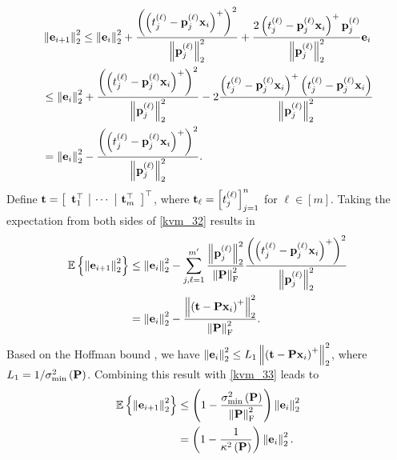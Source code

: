 \documentclass[12pt,draftcls,onecolumn]{IEEEtran}
\begin{document}
\begin{equation}
\begin{aligned}
\label{kvm_32}
&\left\|\mbe_{i+1}\right\|^2_2\leq \left\|\mbe_i\right\|^2_2+\frac{\left(\left(t^{(\ell)}_j-\mbp^{(\ell)}_j\mbx_{i}\right)^+\right)^2}{\left\|\mbp^{(\ell)}_j\right\|^2_2}+\frac{2\left(t^{(\ell)}_j-\mbp^{(\ell)}_j\mbx_{i}\right)^+\mbp^{(\ell)}_j}{\left\|\mbp^{(\ell)}_j\right\|^2_2}\mbe_i \\
&\leq\left\|\mbe_i\right\|^2_2+\frac{\left(\left(t^{(\ell)}_j-\mbp^{(\ell)}_j\mbx_{i}\right)^+\right)^2}{\left\|\mbp^{(\ell)}_j\right\|^2_2}-2\frac{\left(t^{(\ell)}_j-\mbp^{(\ell)}_j\mbx_{i}\right)^+\left(t^{(\ell)}_j-\mbp^{(\ell)}_j\mbx_{i}\right)}{\left\|\mbp^{(\ell)}_j\right\|^2_2}\\
&= \left\|\mbe_i\right\|^2_2-\frac{\left(\left(t^{(\ell)}_j-\mbp^{(\ell)}_j\mbx_{i}\right)^+\right)^2}{\left\|\mbp^{(\ell)}_j\right\|^2_2}.
\end{aligned}
\end{equation}\normalsize
Define $\mathbf{t}=\left[\begin{array}{c|c|c}
\mathbf{t}_1^{\top} &\cdots &\mathbf{t}_m^{\top}
\end{array}\right]^{\top}$, where $\mathbf{t}_{\ell}=\left[t_j^{(\ell)}\right]_{j=1}^{n}$ for $\ell\in[m]$. Taking the expectation from both sides of \eqref{kvm_32} results in 
\begin{equation}
\begin{aligned}
\label{kvm_33}
\mathbb{E}\left\{\left\|\mbe_{i+1}\right\|^2_2\right\}&\leq \left\|\mbe_i\right\|^2_2-\sum_{j,\ell=1}^{m^{\prime}}\frac{\left\|\mbp^{(\ell)}_j\right\|^2_2}{\left\|\mbP\right\|^2_{\mathrm{F}}}\frac{\left(\left(t^{(\ell)}_j-\mbp^{(\ell)}_j\mbx_{i}\right)^+\right)^2}{\left\|\mbp^{(\ell)}_j\right\|^2_2}\\
&= \left\|\mbe_i\right\|^2_2-\frac{\left\|\left(\mbt-\mbP\mbx_{i}\right)^+\right\|^2_2}{\left\|\mbP\right\|^2_{\mathrm{F}}}.
\end{aligned}
\end{equation} \normalsize
Based on the Hoffman bound \cite[Theorem~4.2]{leventhal2010randomized}, we have $\left\|\mathbf{e}_i\right\|^2_2\leq L_1\left\|\left(\mathbf{t}-\mathbf{P}\mathbf{x}_{i}\right)^+\right\|^2_2$, where $L_1=1/\sigma^2_{\text{min}}\left(\mathbf{P}\right)$. Combining this result with \eqref{kvm_33} leads to
\begin{equation}
\begin{aligned}
\mathbb{E}\left\{\left\|\mathbf{e}_{i+1}\right\|^2_2\right\} &\leq \left(1-\frac{\sigma^2_{\text{min}}\left(\mathbf{P}\right)}{\left\|\mathbf{P}\right\|^2_{\mathrm{F}}}\right) \left\|\mathbf{e}_i\right\|^2_2\\
&= \left(1-\frac{1}{\kappa^{2}\left(\mathbf{P}\right)}\right) \left\|\mathbf{e}_i\right\|^2_2.
\end{aligned}
\end{equation}
\end{document}
